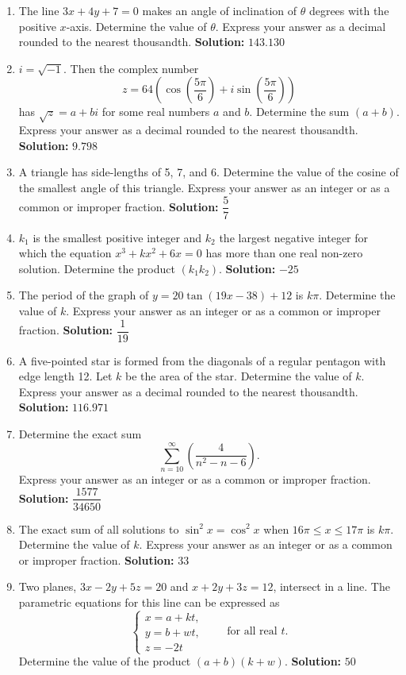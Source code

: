 \documentclass[10pt]{article}
\begin{document}
\begin{enumerate}
\item The line $3x+4y+7=0$ makes an angle of inclination of $\theta$ degrees with the positive $x$-axis. Determine the value of $\theta$. Express your answer as a decimal rounded to the nearest thousandth. \textbf{Solution:} $\boxed{143.130}$

\item $i=\sqrt{-1}$. Then the complex number
\[
z=64\left(\cos\left(\frac{5\pi}{6}\right)+i\sin\left(\frac{5\pi}{6}\right)\right)
\]
has $\sqrt{z}=a+bi$ for some real numbers $a$ and $b$. Determine the sum $(a+b)$. Express your answer as a decimal rounded to the nearest thousandth. \textbf{Solution:} $\boxed{9.798}$

\item A triangle has side-lengths of 5, 7, and 6. Determine the value of the cosine of the smallest angle of this triangle. Express your answer as an integer or as a common or improper fraction. \textbf{Solution:} $\boxed{\dfrac{5}{7}}$

\item $k_1$ is the smallest positive integer and $k_2$ the largest negative integer for which the equation $x^3+kx^2+6x=0$ has more than one real non-zero solution. Determine the product $(k_1k_2)$. \textbf{Solution:} $\boxed{-25}$

\item The period of the graph of $y=20\tan(19x-38)+12$ is $k\pi$. Determine the value of $k$. Express your answer as an integer or as a common or improper fraction. \textbf{Solution:} $\boxed{\dfrac{1}{19}}$

\item A five-pointed star is formed from the diagonals of a regular pentagon with edge length 12. Let $k$ be the area of the star. Determine the value of $k$. Express your answer as a decimal rounded to the nearest thousandth. \textbf{Solution:} $\boxed{116.971}$

\item Determine the exact sum
\[
\sum_{n=10}^{\infty}\left(\frac{4}{n^2-n-6}\right).
\]
Express your answer as an integer or as a common or improper fraction. \textbf{Solution:} $\boxed{\dfrac{1577}{34650}}$

\item The exact sum of all solutions to $\sin^2x=\cos^2x$ when $16\pi\le x\le17\pi$ is $k\pi$. Determine the value of $k$. Express your answer as an integer or as a common or improper fraction. \textbf{Solution:} $\boxed{33}$

\item Two planes, $3x-2y+5z=20$ and $x+2y+3z=12$, intersect in a line. The parametric equations for this line can be expressed as
\[
\begin{cases}
x=a+kt,\\
y=b+wt,\\
z=-2t
\end{cases}
\qquad\text{for all real }t.
\]
Determine the value of the product $(a+b)(k+w)$. \textbf{Solution:} $\boxed{50}$


\end{enumerate}
\end{document}
